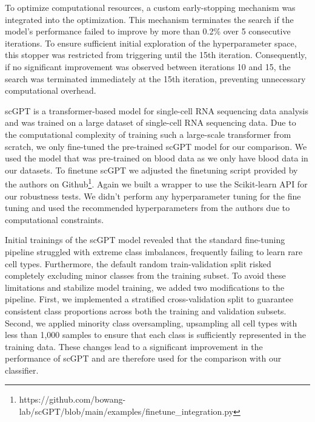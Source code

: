 \documentclass[11pt]{article}
\begin{document}
To optimize computational resources, a custom early-stopping mechanism was integrated into the optimization. This mechanism terminates the search if the model's performance failed to improve by more than 0.2\% over 5 consecutive iterations. To ensure sufficient initial exploration of the hyperparameter space, this stopper was restricted from triggering until the 15th iteration. Consequently, if no significant improvement was observed between iterations 10 and 15, the search was terminated immediately at the 15th iteration, preventing unnecessary computational overhead. %


scGPT \cite{cui_scgpt_2024} is a transformer-based model for single-cell RNA sequencing data analysis and was trained on a large dataset of single-cell RNA sequencing data. 
Due to the computational complexity of training such a large-scale transformer from scratch, we only fine-tuned the pre-trained scGPT model for our comparison. We used the model that was pre-trained on blood data as we only have blood data in our datasets. To finetune scGPT we adjusted the finetuning script provided by the authors on Github\footnote{https://github.com/bowang-lab/scGPT/blob/main/examples/finetune\_integration.py}. Again we built a wrapper to use the Scikit-learn API for our robustness tests.
We didn't perform any hyperparameter tuning for the fine tuning and used the recommended hyperparameters from the authors due to computational constraints. %

Initial trainings of the scGPT model revealed that the standard fine-tuning pipeline struggled with extreme class imbalances, frequently failing to learn rare cell types. Furthermore, the default random train-validation split risked completely excluding minor classes from the training subset. To avoid these limitations and stabilize model training, we added two modifications to the pipeline. First, we implemented a stratified cross-validation split to guarantee consistent class proportions across both the training and validation subsets. Second, we applied minority class oversampling, upsampling all cell types with less than 1,000 samples to ensure that each class is sufficiently represented in the training data. These changes lead to a significant improvement in the performance of scGPT and are therefore used for the comparison with our classifier.
\end{document}
